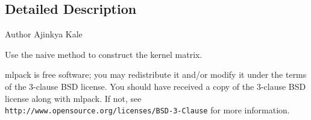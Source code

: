 \subsection{Detailed Description}
\begin{DoxyAuthor}{Author}
Ajinkya Kale
\end{DoxyAuthor}
Use the naive method to construct the kernel matrix.

mlpack is free software; you may redistribute it and/or modify it under the terms of the 3-\/clause B\+SD license. You should have received a copy of the 3-\/clause B\+SD license along with mlpack. If not, see {\tt http\+://www.\+opensource.\+org/licenses/\+B\+S\+D-\/3-\/\+Clause} for more information. 